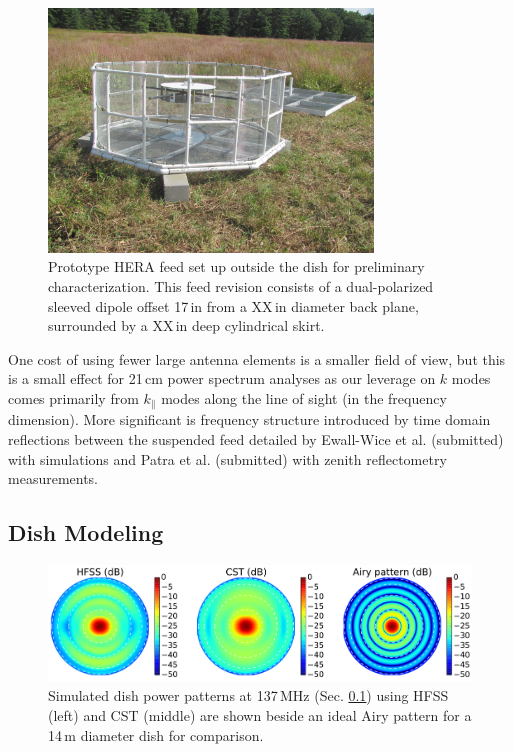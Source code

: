 \documentclass{emulateapj}
\begin{document}
\begin{figure}[h]
\includegraphics[width=3.4in]{feed.jpg}
\caption{Prototype HERA feed set up outside the dish for preliminary characterization. This feed revision consists of a dual-polarized sleeved dipole offset 17\,in from a XX\,in diameter back plane, surrounded by a XX\,in deep cylindrical skirt.}
\label{fig:feedphoto}
\end{figure}

One cost of using fewer large antenna elements is a smaller field of view, but this is a 
small effect for 21\,cm power spectrum analyses as our leverage on $k$ modes comes primarily from $k_\parallel$ modes along the line of sight (in the frequency dimension). More significant is frequency structure introduced by time domain reflections between the suspended feed detailed by Ewall-Wice et al. (submitted) with simulations and Patra et al. (submitted) with zenith reflectometry measurements.

\subsection{Dish Modeling}
\label{sec:dishmodels}

\begin{figure}
\centering
\includegraphics[width=7in]{dave197_rich195_airy_beams.pdf}
\caption{Simulated dish power patterns at 137\,MHz (Sec. \ref{sec:dishmodels}) using HFSS (left) and CST (middle) are shown beside an ideal Airy pattern for a 14\,m diameter dish for comparison.}
\label{fig:modelbeams}
\end{figure}
\end{document}
